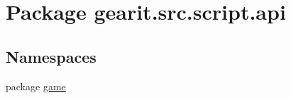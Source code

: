\hypertarget{namespacegearit_1_1src_1_1script_1_1api}{\section{Package gearit.\+src.\+script.\+api}
\label{namespacegearit_1_1src_1_1script_1_1api}
}
\subsection*{Namespaces}
\begin{DoxyCompactItemize}
\item 
package \hyperlink{namespacegearit_1_1src_1_1script_1_1api_1_1game}{game}
\end{DoxyCompactItemize}
